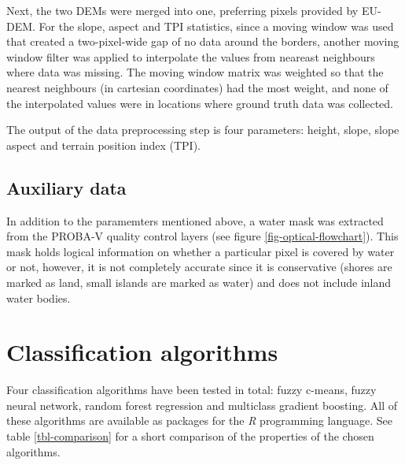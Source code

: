 \documentclass[a4paper,10pt]{book}
\begin{document}
Next, the two DEMs were merged into one, preferring pixels provided by EU-DEM. For the slope, aspect and TPI statistics, since a moving window was used that created a two-pixel-wide gap of no data around the borders, another moving window filter was applied to interpolate the values from neareast neighbours where data was missing. The moving window matrix was weighted so that the nearest neighbours (in cartesian coordinates) had the most weight, and none of the interpolated values were in locations where ground truth data was collected.

The output of the data preprocessing step is four parameters: height, slope, slope aspect and terrain position index (TPI).

\subsection{Auxiliary data}

In addition to the paramemters mentioned above, a water mask was extracted from the PROBA-V quality control layers (see figure \ref{fig-optical-flowchart}). This mask holds logical information on whether a particular pixel is covered by water or not, however, it is not completely accurate since it is conservative (shores are marked as land, small islands are marked as water) and does not include inland water bodies.

\section{Classification algorithms}

Four classification algorithms have been tested in total: fuzzy c-means, fuzzy neural network, random forest regression and multiclass gradient boosting. All of these algorithms are available as packages for the \textit{R} programming language. See table \ref{tbl-comparison} for a short comparison of the properties of the chosen algorithms.

\begin{table}
  \begin{center}
  \end{center}
  \caption{Feature comparison between classification algorithms whose classification accuracy will be compared in the thesis. ``Partially fuzzy'' means the capability of training only on endmember pixels.}
  \label{tbl-comparison}
\end{table}
\end{document}
